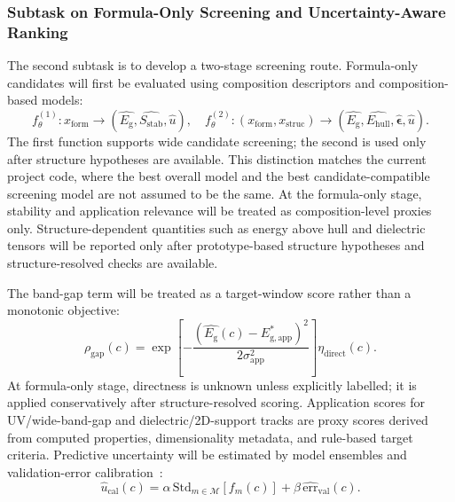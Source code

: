 \documentclass[12pt,a4paper]{article}
\newcommand{\eg}{E_{\mathrm{g}}}
\newcommand{\ehull}{E_{\mathrm{hull}}}
\newcommand{\form}{x_{\mathrm{form}}}
\newcommand{\struc}{x_{\mathrm{struc}}}
\newcommand{\unc}{u}
\newcommand{\stab}{S_{\mathrm{stab}}}
\newcommand{\gapscore}{\rho_{\mathrm{gap}}}
\begin{document}
\subsubsection{Subtask on Formula-Only Screening and Uncertainty-Aware Ranking}
\label{subsubsec:screening-ranking}
\vspace{-5pt}
The second subtask is to develop a two-stage screening route. Formula-only candidates will first be evaluated using composition descriptors and composition-based models:
\begin{equation}
  f_{\theta}^{(1)}:\form\rightarrow(\hat{\eg},\hat{\stab},\hat{\unc}),
  \quad
  f_{\theta}^{(2)}:(\form,\struc)\rightarrow
  (\hat{\eg},\hat{\ehull},\hat{\boldsymbol{\epsilon}},\hat{\unc}).
\end{equation}
The first function supports wide candidate screening; the second is used only after structure hypotheses are available. This distinction matches the current project code, where the best overall model and the best candidate-compatible screening model are not assumed to be the same. At the formula-only stage, stability and application relevance will be treated as composition-level proxies only. Structure-dependent quantities such as energy above hull and dielectric tensors will be reported only after prototype-based structure hypotheses and structure-resolved checks are available.

The band-gap term will be treated as a target-window score rather than a monotonic objective:
\begin{equation}
  \gapscore(c)=
  \exp\!\left[-\frac{(\hat{\eg}(c)-E^*_{\mathrm{g,app}})^2}{2\sigma_{\mathrm{app}}^2}\right]\eta_{\mathrm{direct}}(c).
\end{equation}
At formula-only stage, directness is unknown unless explicitly labelled; it is applied conservatively after structure-resolved scoring. Application scores for UV/wide-band-gap and dielectric/2D-support tracks are proxy scores derived from computed properties, dimensionality metadata, and rule-based target criteria. Predictive uncertainty will be estimated by model ensembles and validation-error calibration~\cite{gal2016_dropout,lakshminarayanan2017_ensembles}:
\begin{equation}
  \hat{\unc}_{\mathrm{cal}}(c)=
  \alpha\,\mathrm{Std}_{m\in\mathcal{M}}[f_m(c)]
  +\beta\,\widehat{\mathrm{err}}_{\mathrm{val}}(c).
\end{equation}
\end{document}
